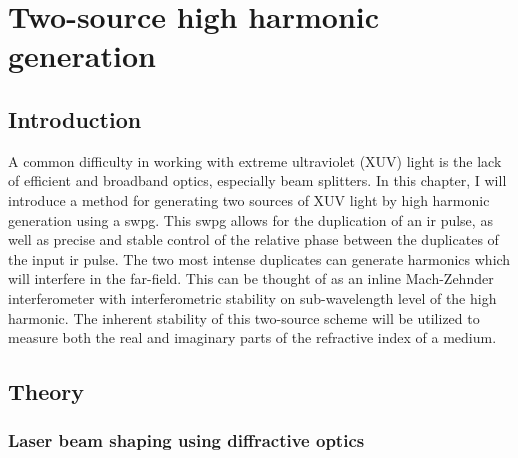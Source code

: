 \chapter{Two-source high harmonic generation}
\label{chap:two_source}

\section{Introduction}
\label{intro_ts}

A common difficulty in working with extreme ultraviolet (XUV) light is the lack of efficient and broadband optics, especially beam splitters. In this chapter, I will introduce a method for generating two sources of XUV light by high harmonic generation using a \gls{swpg}.  This \gls{swpg} allows for the duplication of an \gls{ir} pulse, as well as precise and stable control of the relative phase between the duplicates of the input \gls{ir} pulse. The two most intense duplicates can generate harmonics which will interfere in the far-field. This can be thought of as an inline Mach-Zehnder interferometer with interferometric stability on sub-wavelength level of the high harmonic. The inherent stability of this two-source scheme will be utilized to measure both the real and imaginary parts of the refractive index of a medium.

\section{Theory}
\subsection{Laser beam shaping using diffractive optics}
\label{sec:beam_shaping}

